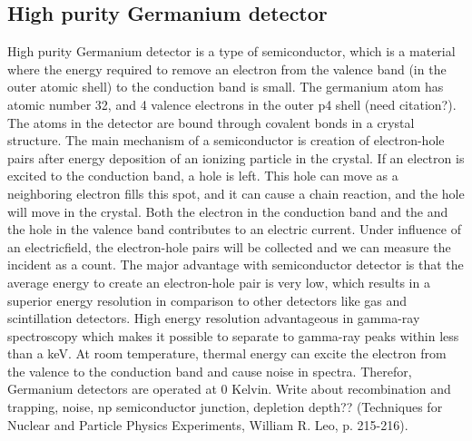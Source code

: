



\subsection{High purity Germanium detector}
High purity Germanium detector is a type of semiconductor, which is a material where the energy required to remove an electron from the valence band (in the outer atomic shell) to the conduction band is small. The germanium atom has atomic number 32, and 4 valence electrons in the outer p4 shell (need citation?). The atoms in the detector are bound through covalent bonds in a crystal structure. The main mechanism of a semiconductor is creation of electron-hole pairs after energy deposition of an ionizing particle in the crystal. If an electron is excited to the conduction band, a hole is left. This hole can move as a neighboring electron fills this spot, and it can cause a chain reaction, and the hole will move in the crystal. Both the electron in the conduction band and the  and the hole in the valence band contributes to an electric current. Under influence of an electricfield, the electron-hole pairs will be collected and we can measure the incident as a count. The major
advantage with semiconductor detector is that the average energy to create an electron-hole pair is
very low, which results in a superior energy resolution in comparison to other detectors like gas and
scintillation detectors. High energy resolution advantageous in gamma-ray spectroscopy which makes
it possible to separate to gamma-ray peaks within less than a keV. At room temperature, thermal
energy can excite the electron from the valence to the conduction band and cause noise in spectra.
Therefor, Germanium detectors are operated at 0 Kelvin. Write about recombination and trapping,
noise, np semiconductor junction, depletion depth?? (Techniques for Nuclear and Particle Physics Experiments, William R. Leo, p. 215-216). 


